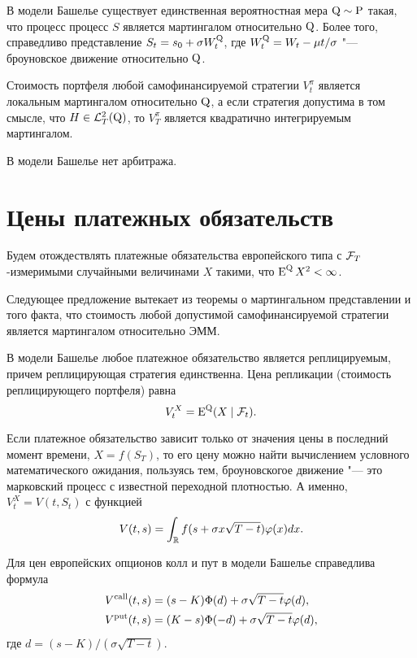 \begin{proposition}
В модели Башелье существует единственная вероятностная мера $\mathrm{Q}\sim\mathrm{P}$ такая, что процесс процесс $S$ является мартингалом относительно $\mathrm{Q}$.
Более того, справедливо представление $S_t = s_0 + \sigma W_t^{\mathrm{Q}}$, где $W_t^{\mathrm{Q}} = W_t - \mu t/\sigma$ "--- броуновское движение относительно $\mathrm{Q}$.

Стоимость портфеля любой самофинансируемой стратегии $V_t^\pi$ является локальным мартингалом относительно $\mathrm{Q}$, а если стратегия допустима в том смысле, что $H\in \mathcal{L}^2_T(\mathrm{Q})$, то $V_T^\pi$ является квадратично интегрируемым мартингалом.
\end{proposition}

\begin{corollary}
В модели Башелье нет арбитража.
\end{corollary}

\section{Цены платежных обязательств}
Будем отождествлять платежные обязательства европейского типа с $\mathcal{F}_T$-измеримыми случайными величинами $X$ такими, что $\operatorname{E}^{\mathrm{Q}} X^2 < \infty$.  

Следующее предложение вытекает из теоремы о мартингальном представлении и того факта, что стоимость любой допустимой самофинансируемой стратегии является мартингалом относительно ЭММ.

\begin{proposition}
В модели Башелье любое платежное обязательство  является реплицируемым, причем реплицирующая стратегия единственна.
Цена репликации (стоимость реплицирующего портфеля) равна
\[
V_t^X = \operatorname{E}^{\mathrm{Q}} (X \mid \mathcal{F}_t).
\]
\end{proposition}

Если платежное обязательство зависит только от значения цены в последний момент времени, $X=f(S_T)$, то его цену можно найти вычислением условного математического ожидания, пользуясь тем, броуновскогое движение "--- это марковский процесс с известной переходной плотностью. А именно, $V_t^X = V(t,S_t)$ с функцией
\[
V(t,s) = \int_{\mathbb{R}} f(s + \sigma x\sqrt{T-t}) \varphi(x) dx.
\]

\begin{corollary}
Для цен европейских опционов колл и пут в модели Башелье справедлива формула
\[
\begin{aligned}
&V^{\text{\normalfont call}}(t,s) = (s-K)\Phi(d) + \sigma \sqrt{T-t}\varphi(d),\\
&V^{\text{\normalfont put}}(t,s) = (K-s)\Phi(-d) + \sigma\sqrt{T-t}\varphi(d),
\end{aligned}
\]
где $d = (s-K) /(\sigma\sqrt{T-t})$.
\end{corollary}

